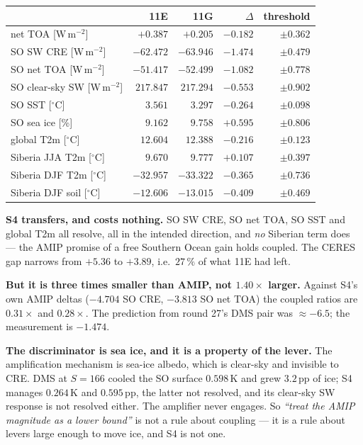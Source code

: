 \documentclass[10pt]{article}
\begin{document}
\begin{center}\footnotesize
\begin{tabular}{l r r r r}
\toprule
& 11E & 11G & $\Delta$ & threshold \\
\midrule
net TOA [W\,m$^{-2}$] & $+0.387$ & $+0.205$ & $-0.182$ & $\pm0.362$ \\
SO SW CRE [W\,m$^{-2}$] & $-62.472$ & $-63.946$ & $\mathbf{-1.474}$ & $\pm0.479$ \\
SO net TOA [W\,m$^{-2}$] & $-51.417$ & $-52.499$ & $\mathbf{-1.082}$ & $\pm0.778$ \\
SO clear-sky SW [W\,m$^{-2}$] & $217.847$ & $217.294$ & $-0.553$ & $\pm0.902$ \\
SO SST [$^\circ$C] & $3.561$ & $3.297$ & $\mathbf{-0.264}$ & $\pm0.098$ \\
SO sea ice [\%] & $9.162$ & $9.758$ & $+0.595$ & $\pm0.806$ \\
global T2m [$^\circ$C] & $12.604$ & $12.388$ & $\mathbf{-0.216}$ & $\pm0.123$ \\
Siberia JJA T2m [$^\circ$C] & $9.670$ & $9.777$ & $+0.107$ & $\pm0.397$ \\
Siberia DJF T2m [$^\circ$C] & $-32.957$ & $-33.322$ & $-0.365$ & $\pm0.736$ \\
Siberia DJF soil [$^\circ$C] & $-12.606$ & $-13.015$ & $-0.409$ & $\pm0.469$ \\
\bottomrule
\end{tabular}
\end{center}

\noindent \textbf{S4 transfers, and costs nothing.} SO SW CRE, SO net TOA, SO SST and
global T2m all resolve, all in the intended direction, and \emph{no} Siberian term does
--- the AMIP promise of a free Southern Ocean gain holds coupled. The CERES gap narrows
from $+5.36$ to $+3.89$, i.e.\ $27\,\%$ of what 11E had left.

\textbf{But it is three times smaller than AMIP, not $1.40\times$ larger.} Against S4's
own AMIP deltas ($-4.704$ SO CRE, $-3.813$ SO net TOA) the coupled ratios are
$\mathbf{0.31\times}$ and $\mathbf{0.28\times}$. The prediction from round 27's DMS pair
was ${\approx}-6.5$; the measurement is $-1.474$.

\textbf{The discriminator is sea ice, and it is a property of the lever.} The
amplification mechanism is sea-ice albedo, which is clear-sky and invisible to CRE. DMS
at $S=166$ cooled the SO surface $0.598$\,K and grew $3.2$\,pp of ice; S4 manages
$0.264$\,K and $0.595$\,pp, the latter not resolved, and its clear-sky SW response is not
resolved either. The amplifier never engages. So \emph{``treat the AMIP magnitude as a
lower bound''} is not a rule about coupling --- it is a rule about levers large enough to
move ice, and S4 is not one.
\end{document}
